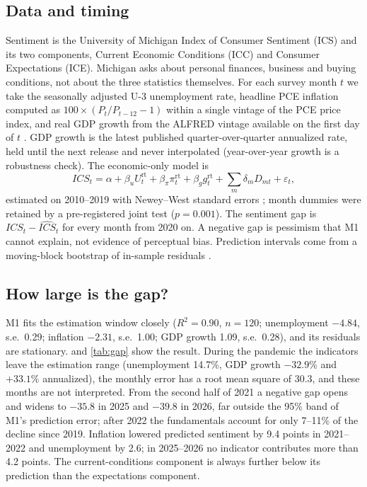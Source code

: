 \documentclass[11pt]{article}
\begin{document}
\subsection{Data and timing}
Sentiment is the University of Michigan Index of Consumer Sentiment (ICS) and its two components, Current Economic Conditions (ICC) and Consumer Expectations (ICE). Michigan asks about personal finances, business and buying conditions, not about the three statistics themselves. For each survey month $t$ we take the seasonally adjusted U-3 unemployment rate, headline PCE inflation computed as $100 \times (P_t/P_{t-12} - 1)$ within a single vintage of the PCE price index, and real GDP growth from the ALFRED vintage available on the first day of $t$ \citep{croushore2001,alfred}. GDP growth is the latest published quarter-over-quarter annualized rate, held until the next release and never interpolated (year-over-year growth is a robustness check). The economic-only model is
\begin{equation}
  \mathit{ICS}_t = \alpha + \beta_u U^{\mathrm{rt}}_t + \beta_\pi \pi^{\mathrm{rt}}_t + \beta_g g^{\mathrm{rt}}_t + \textstyle\sum_{m} \delta_m D_{mt} + \varepsilon_t ,
  \label{eq:m1}
\end{equation}
estimated on 2010–2019 with Newey–West standard errors \citep{newey1987}; month dummies were retained by a pre-registered joint test ($p = 0.001$). The sentiment gap is $\mathit{ICS}_t - \widehat{\mathit{ICS}}_t$ for every month from 2020 on. A negative gap is pessimism that M1 cannot explain, not evidence of perceptual bias. Prediction intervals come from a moving-block bootstrap of in-sample residuals \citep{kunsch1989}.

\subsection{How large is the gap?}
M1 fits the estimation window closely ($R^2 = 0.90$, $n = 120$; unemployment $-4.84$, s.e.\ 0.29; inflation $-2.31$, s.e.\ 1.00; GDP growth 1.09, s.e.\ 0.28), and its residuals are stationary.  and \cref{tab:gap} show the result. During the pandemic the indicators leave the estimation range (unemployment 14.7\%, GDP growth $-32.9\%$ and $+33.1\%$ annualized), the monthly error has a root mean square of 30.3, and these months are not interpreted. From the second half of 2021 a negative gap opens and widens to $-35.8$ in 2025 and $-39.8$ in 2026, far outside the 95\% band of M1's prediction error; after 2022 the fundamentals account for only 7–11\% of the decline since 2019. Inflation lowered predicted sentiment by 9.4 points in 2021–2022 and unemployment by 2.6; in 2025–2026 no indicator contributes more than 4.2 points. The current-conditions component is always further below its prediction than the expectations component.
\end{document}
